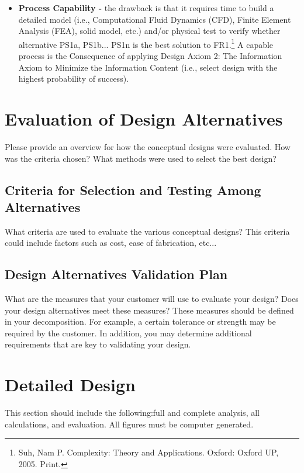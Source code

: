 \documentclass{other/docTemplate}
\begin{document}
\begin{itemize}
\item \textbf{Process Capability -} the drawback is that it requires time to build a detailed model (i.e.,  Computational Fluid Dynamics (CFD), Finite Element Analysis (FEA), solid model, etc.) and/or physical test to verify whether alternative PS1a, PS1b...  PS1n is the best solution to FR1.\footnote{Suh, Nam P. Complexity: Theory and Applications. Oxford: Oxford UP, 2005. Print.}   A capable process is the Consequence of applying Design Axiom 2: The Information Axiom to Minimize the Information Content (i.e., select design with the highest probability of success).

\end{itemize}

\clearpage
\section{Evaluation of Design Alternatives}

Please provide an overview for how the conceptual designs were evaluated. How was the criteria chosen? What methods were used to select the best design?

\subsection{Criteria for Selection and Testing Among Alternatives}

What criteria are used to evaluate the various conceptual designs? This criteria could include factors such as cost, ease of fabrication, etc...


\subsection{Design Alternatives Validation Plan}

What are the measures that your customer will use to evaluate your design? Does your design alternatives meet these measures? These measures should be defined in your decomposition. For example, a certain tolerance or strength may be required by the customer. In addition, you may determine additional requirements that are key to validating your design. 



\clearpage
\section{Detailed Design}
This section should include the following:full and complete analysis, all calculations, and evaluation. All figures must be computer generated. 
\end{document}

